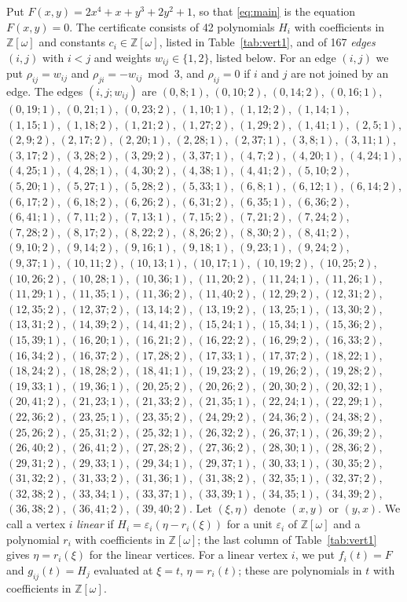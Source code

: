 \documentclass[11pt]{article}
\newcommand{\Z}{\mathbb{Z}}
\begin{document}
Put $F(x,y)=2x^{4}+x+y^{3}+2y^{2}+1$, so that \eqref{eq:main} is the equation $F(x,y)=0$. The certificate consists of 42 polynomials $H_i$ with coefficients in $\Z[\omega]$ and constants $c_i\in\Z[\omega]$, listed in Table~\ref{tab:vert1}, and of 167 \emph{edges} $(i,j)$ with $i<j$ and weights $w_{ij}\in\{1,2\}$, listed below. For an edge $(i,j)$ we put $\rho_{ij}=w_{ij}$ and $\rho_{ji}=-w_{ij}\bmod 3$, and $\rho_{ij}=0$ if $i$ and $j$ are not joined by an edge.
The edges $(i,j;w_{ij})$ are $(0,8;1)$, $(0,10;2)$, $(0,14;2)$, $(0,16;1)$, $(0,19;1)$, $(0,21;1)$, $(0,23;2)$, $(1,10;1)$, $(1,12;2)$, $(1,14;1)$, $(1,15;1)$, $(1,18;2)$, $(1,21;2)$, $(1,27;2)$, $(1,29;2)$, $(1,41;1)$, $(2,5;1)$, $(2,9;2)$, $(2,17;2)$, $(2,20;1)$, $(2,28;1)$, $(2,37;1)$, $(3,8;1)$, $(3,11;1)$, $(3,17;2)$, $(3,28;2)$, $(3,29;2)$, $(3,37;1)$, $(4,7;2)$, $(4,20;1)$, $(4,24;1)$, $(4,25;1)$, $(4,28;1)$, $(4,30;2)$, $(4,38;1)$, $(4,41;2)$, $(5,10;2)$, $(5,20;1)$, $(5,27;1)$, $(5,28;2)$, $(5,33;1)$, $(6,8;1)$, $(6,12;1)$, $(6,14;2)$, $(6,17;2)$, $(6,18;2)$, $(6,26;2)$, $(6,31;2)$, $(6,35;1)$, $(6,36;2)$, $(6,41;1)$, $(7,11;2)$, $(7,13;1)$, $(7,15;2)$, $(7,21;2)$, $(7,24;2)$, $(7,28;2)$, $(8,17;2)$, $(8,22;2)$, $(8,26;2)$, $(8,30;2)$, $(8,41;2)$, $(9,10;2)$, $(9,14;2)$, $(9,16;1)$, $(9,18;1)$, $(9,23;1)$, $(9,24;2)$, $(9,37;1)$, $(10,11;2)$, $(10,13;1)$, $(10,17;1)$, $(10,19;2)$, $(10,25;2)$, $(10,26;2)$, $(10,28;1)$, $(10,36;1)$, $(11,20;2)$, $(11,24;1)$, $(11,26;1)$, $(11,29;1)$, $(11,35;1)$, $(11,36;2)$, $(11,40;2)$, $(12,29;2)$, $(12,31;2)$, $(12,35;2)$, $(12,37;2)$, $(13,14;2)$, $(13,19;2)$, $(13,25;1)$, $(13,30;2)$, $(13,31;2)$, $(14,39;2)$, $(14,41;2)$, $(15,24;1)$, $(15,34;1)$, $(15,36;2)$, $(15,39;1)$, $(16,20;1)$, $(16,21;2)$, $(16,22;2)$, $(16,29;2)$, $(16,33;2)$, $(16,34;2)$, $(16,37;2)$, $(17,28;2)$, $(17,33;1)$, $(17,37;2)$, $(18,22;1)$, $(18,24;2)$, $(18,28;2)$, $(18,41;1)$, $(19,23;2)$, $(19,26;2)$, $(19,28;2)$, $(19,33;1)$, $(19,36;1)$, $(20,25;2)$, $(20,26;2)$, $(20,30;2)$, $(20,32;1)$, $(20,41;2)$, $(21,23;1)$, $(21,33;2)$, $(21,35;1)$, $(22,24;1)$, $(22,29;1)$, $(22,36;2)$, $(23,25;1)$, $(23,35;2)$, $(24,29;2)$, $(24,36;2)$, $(24,38;2)$, $(25,26;2)$, $(25,31;2)$, $(25,32;1)$, $(26,32;2)$, $(26,37;1)$, $(26,39;2)$, $(26,40;2)$, $(26,41;2)$, $(27,28;2)$, $(27,36;2)$, $(28,30;1)$, $(28,36;2)$, $(29,31;2)$, $(29,33;1)$, $(29,34;1)$, $(29,37;1)$, $(30,33;1)$, $(30,35;2)$, $(31,32;2)$, $(31,33;2)$, $(31,36;1)$, $(31,38;2)$, $(32,35;1)$, $(32,37;2)$, $(32,38;2)$, $(33,34;1)$, $(33,37;1)$, $(33,39;1)$, $(34,35;1)$, $(34,39;2)$, $(36,38;2)$, $(36,41;2)$, $(39,40;2)$.
Let $(\xi,\eta)$ denote $(x,y)$ or $(y,x)$. We call a vertex $i$ \emph{linear} if $H_i=\varepsilon_i(\eta-r_i(\xi))$ for a unit $\varepsilon_i$ of $\Z[\omega]$ and a polynomial $r_i$ with coefficients in $\Z[\omega]$; the last column of Table~\ref{tab:vert1} gives $\eta=r_i(\xi)$ for the linear vertices. For a linear vertex $i$, we put $f_i(t)=F$ and $g_{ij}(t)=H_j$ evaluated at $\xi=t$, $\eta=r_i(t)$; these are polynomials in $t$ with coefficients in $\Z[\omega]$.
\end{document}
